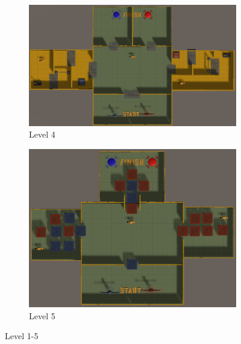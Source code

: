 \begin{figure}[h!]
\begin{subfigure}[b]{0.45\linewidth}
        \includegraphics[width=\linewidth]{images/level_4.png}
        \caption{Level 4}
        \label{fig:level 4}
      \end{subfigure}
    \begin{subfigure}[b]{0.45\linewidth}
        \includegraphics[width=\linewidth]{images/level_5.png}
        \caption{Level 5}
        \label{fig:level 5}
      \end{subfigure}
    \caption{Level 1-5}
\end{figure}


